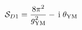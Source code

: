 \begin{equation}
\label{insgrd}
{\cal S}_{D1} =  \frac{8 \pi^2}{g_{\rm YM}^2} - \, {\rm i}
\;\theta_{\rm YM}
\end{equation}

